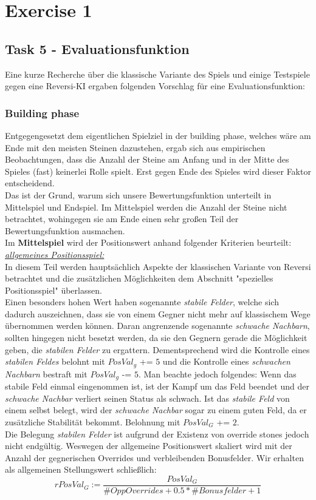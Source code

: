 \section{Exercise 1}
\subsection{Task 5 - Evaluationsfunktion}
Eine kurze Recherche über die klassische Variante des Spiels und einige Testspiele gegen eine Reversi-KI ergaben folgenden Vorschlag für eine Evaluationsfunktion:
\subsubsection{Building phase}
Entgegengesetzt dem eigentlichen Spielziel in der building phase, welches wäre am Ende mit den meisten Steinen dazustehen, ergab sich aus empirischen Beobachtungen, dass die Anzahl der Steine am Anfang und in der Mitte des Spieles (fast) keinerlei Rolle spielt. Erst gegen Ende des Spieles wird dieser Faktor entscheidend.\\
Das ist der Grund, warum sich unsere Bewertungsfunktion unterteilt in Mittelspiel und  Endspiel. Im Mittelspiel werden die Anzahl der Steine nicht betrachtet, wohingegen sie am Ende einen sehr großen Teil der Bewertungsfunktion ausmachen.\\
Im \textbf{Mittelspiel} wird der Positionswert anhand folgender Kriterien beurteilt:\\

\underline{\textit{allgemeines Positionsspiel:}}\\
In diesem Teil werden hauptsächlich Aspekte der klassischen Variante von Reversi betrachtet und die zusätzlichen Möglichkeiten dem Abschnitt "spezielles Positionsspiel" überlassen.\\
Einen besonders hohen Wert haben sogenannte \textit{stabile Felder}, welche sich dadurch auszeichnen, dass sie von einem Gegner nicht mehr auf klassischem Wege übernommen werden können. Daran angrenzende sogenannte \textit{schwache Nachbarn}, sollten hingegen nicht besetzt werden, da sie den Gegnern gerade die Möglichkeit geben, die \textit{stabilen Felder} zu ergattern. Dementsprechend wird die Kontrolle eines \textit{stabilen Feldes} belohnt mit $PosVal_g$ += $5$ und die Kontrolle eines \textit{schwachen Nachbarn} bestraft mit $PosVal_g$ -= $5$. Man beachte jedoch folgendes: Wenn das stabile Feld einmal eingenommen ist, ist der Kampf um das Feld beendet und der \textit{schwache Nachbar} verliert seinen Status als schwach. Ist das \textit{stabile Feld} von einem selbst belegt, wird der \textit{schwache Nachbar} sogar zu einem guten Feld, da er zusätzliche Stabilität bekommt. Belohnung mit $PosVal_G$ += $2$.\\
Die Belegung \textit{stabilen Felder} ist aufgrund der Existenz von override stones jedoch nicht endgültig. Weswegen der allgemeine Positionswert skaliert wird mit der Anzahl der gegnerischen Overrides und verbleibenden Bonusfelder. Wir erhalten als allgemeinen Stellungswert schließlich:
$$rPosVal_G := \dfrac{PosVal_G}{\#OppOverrides + 0.5*\#Bonusfelder + 1}$$\\

